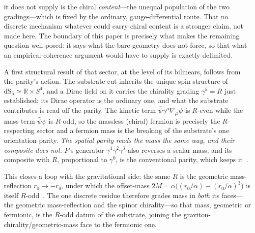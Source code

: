 \documentclass[11pt]{article}
\theoremstyle{plain}
\theoremstyle{remark}
\newcommand{\dS}{\mathrm{dS}}
\begin{document}
it does not supply is the chiral \emph{content}---the unequal population of the two gradings---which is fixed by the ordinary, gauge-differential route. That no discrete mechanism whatever could carry chiral content is a stronger claim, not made here. The boundary of this paper is precisely what makes the remaining question well-posed: it says what the bare geometry does not force, so that what an empirical-coherence argument would have to supply is exactly delimited.

A first structural result of that sector, at the level of its bilinears, follows from the parity's action. The substrate cut inherits the unique spin structure of $\dS_5\simeq\mathbb{R}\times S^4$, and a Dirac field on it carries the chirality grading $\gamma^5=R$ just established; its Dirac operator is the ordinary one, and what the substrate contributes is read off the parity. The kinetic term $\bar\psi\gamma^\mu\nabla_\mu\psi$ is $R$-even while the mass term $\bar\psi\psi$ is $R$-odd, so the massless (chiral) fermion is precisely the $R$-respecting sector and a fermion mass is the breaking of the substrate's one orientation parity. \emph{The spatial parity reads the mass the same way, and their composite does not}: $P$'s generator $\gamma^{1}\gamma^{2}\gamma^{3}$ also reverses a scalar mass, and its composite with $R$, proportional to $\gamma^{0}$, is the conventional parity, which keeps it~\cite{JanzenMatter}.

This closes a loop with the gravitational side: the same $R$ is the geometric mass-reflection $r_0\mapsto-r_0$, under which the offset-mass $2M=\alpha\bigl((r_0/\alpha)-(r_0/\alpha)^3\bigr)$ is itself $R$-odd~\cite{JanzenOperator,JanzenAlgebroid}. The one discrete residue therefore grades mass in \emph{both} its faces---the geometric mass-reflection and the spinor chirality---so that mass, geometric or fermionic, is the $R$-odd datum of the substrate, joining the graviton-chirality/geometric-mass face to the fermionic one.
\end{document}
